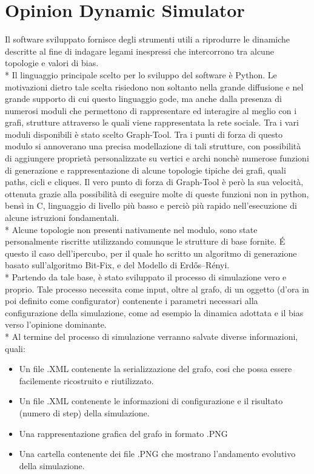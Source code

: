 \documentclass{article}
\begin{document}
\section{Opinion Dynamic Simulator}
Il software sviluppato fornisce degli strumenti utili a riprodurre le dinamiche descritte al fine di indagare legami inespressi che intercorrono tra alcune topologie e valori di bias.\\*
Il linguaggio principale scelto per lo sviluppo del software è Python. Le motivazioni dietro tale scelta risiedono non soltanto nella grande diffusione e nel grande supporto di cui questo linguaggio gode, ma anche dalla presenza di numerosi moduli che permettono di rappresentare ed interagire al meglio con i grafi, strutture attraverso le quali viene rappresentata la rete sociale.
Tra i vari moduli disponibili è stato scelto Graph-Tool. Tra i punti di forza di questo modulo si annoverano una precisa modellazione di tali strutture, con possibilità di aggiungere proprietà personalizzate su vertici e archi nonchè numerose funzioni di generazione e rappresentazione di alcune topologie tipiche dei grafi, quali paths, cicli e cliques. Il vero punto di forza di Graph-Tool è però la sua velocità, ottenuta grazie alla possibilità di eseguire molte di queste funzioni non in python, bensì in C, linguaggio di livello più basso e perciò più rapido nell'esecuzione di alcune istruzioni fondamentali.\\*
Alcune topologie non presenti nativamente nel modulo, sono state personalmente riscritte utilizzando comunque le strutture di base fornite. É questo il caso dell'ipercubo, per il quale ho scritto un algoritmo di generazione basato sull'algoritmo Bit-Fix, e del Modello di Erdős–Rényi.\\*
Partendo da tale base, è stato sviluppato il processo di simulazione vero e proprio. Tale processo necessita come input, oltre al grafo, di un oggetto (d'ora in poi definito come configurator) contenente i parametri necessari alla configurazione della simulazione, come ad esempio la dinamica adottata e il bias verso l'opinione dominante.\\* 
Al termine del processo di simulazione verranno salvate diverse informazioni, quali:
\begin{itemize}
\item Un file .XML contenente la serializzazione del grafo, cosi che possa essere facilemente ricostruito e riutilizzato.
\item Un file .XML contenente le informazioni di configurazione e il risultato (numero di step) della simulazione.
\item Una rappresentazione grafica del grafo in formato .PNG
\item Una cartella contenente dei file .PNG che mostrano l'andamento evolutivo della simulazione.
\end{itemize}
\end{document}
